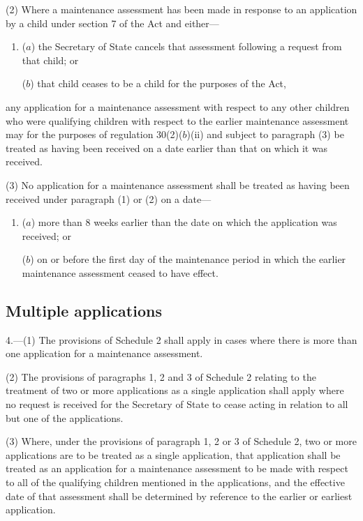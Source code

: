 \documentclass[a4paper,12pt]{article}
\begin{document}
(2) Where a maintenance assessment has been made in response to an application by a child under section 7 of the Act and either—
\begin{enumerate}\item[]
($a$) 
the Secretary of State  %
cancels that assessment following a request from that child; or

($b$) that child ceases to be a child for the purposes of the Act,
\end{enumerate}
any application for a maintenance assessment with respect to any other children who were qualifying children with respect to the earlier maintenance assessment may for the purposes of regulation 30(2)($b$)(ii) and subject to paragraph (3) be treated as having been received on a date earlier than that on which it was received.

(3) No application for a maintenance assessment shall be treated as having been received under paragraph (1) or (2) on a date—
\begin{enumerate}\item[]
($a$) more than 8 weeks earlier than the date on which the application was received; or

($b$) on or before the first day of the maintenance period in which the earlier maintenance assessment ceased to have effect.
\end{enumerate}


\subsection[4. Multiple applications]{Multiple applications}

4.—(1) The provisions of Schedule 2 shall apply in cases where there is more than one application for a maintenance assessment.

(2) The provisions of paragraphs 1, 2 and 3 of Schedule 2 relating to the treatment of two or more applications as a single application shall apply where no request is received for the Secretary of State to cease acting in relation to all but one of the applications.

(3) Where, under the provisions of paragraph 1, 2 or 3 of Schedule 2, two or more applications are to be treated as a single application, that application shall be treated as an application for a maintenance assessment to be made with respect to all of the qualifying children mentioned in the applications, and the effective date of that assessment shall be determined by reference to the earlier or earliest application.
\end{document}
